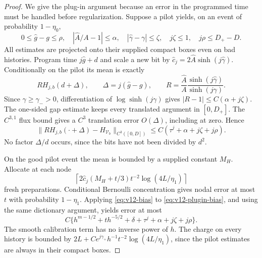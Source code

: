 \begin{proof}
We give the plug-in argument because an error in the programmed time
must be handled before regularization. Suppose a pilot yields, on
an event of probability $1-\eta_0$,
\[
 0\le\widehat g-g\le\rho,
 \quad |\widehat A/A-1|\le\alpha,
 \quad |\widehat\gamma-\gamma|\le\zeta,
 \quad j\zeta\le1,\quad j\rho\le D_+-D.
\]
All estimates are projected onto their supplied compact boxes even
on bad histories. Program time $j\widehat g+d$ and scale a new
bit by $\widehat c_j=2\widehat A\sinh(j\widehat\gamma)$.
Conditionally on the pilot its mean is exactly
\[
 R H_{j,b}(d+\Delta),\qquad
 \Delta=j(\widehat g-g),\qquad
 R=\frac{\widehat A}{A}
                         \frac{\sinh(j\widehat\gamma)}{\sinh(j\gamma)}.
\]
Since $\gamma\ge\gamma_->0$, differentiation of $\log\sinh(j\gamma)$
gives $|R-1|\le C(\alpha+j\zeta)$. The one-sided gap estimate
keeps every translated argument in $[0,D_+]$. The $C^{3,1}$
flux bound gives a $C^3$ translation error $O(\Delta)$, including
at zero. Hence
\begin{equation}\label{eq:v12-plugin-bias}
 \|R H_{j,b}(\cdot+\Delta)-H_{\mathcal V_b}\|_{C^3([0,D])}
                         \le C(\tau^j+\alpha+j\zeta+j\rho).
\end{equation}
No factor $\Delta/d$ occurs, since the bits have not been divided
by $d^2$.

On the good pilot event the mean is bounded by a supplied constant
$M_H$. Allocate at each node
\[
 \left\lceil2\widehat c_j(M_H+t/3)t^{-2}
                            \log(4L/\eta_1)\right\rceil
\]
fresh preparations. Conditional Bernoulli concentration gives nodal
error at most $t$ with probability $1-\eta_1$. Applying
\eqref{eq:v12-bias} to \eqref{eq:v12-plugin-bias}, and using the
same dictionary argument, yields error at most
\[
 C\{h^{m-1/2}+t h^{-5/2}+\delta+
                       \tau^j+\alpha+j\zeta+j\rho\}.
\]
The smooth calibration term has no inverse power of $h$. The charge
on every history is bounded by
$2L+C e^{j\gamma_+}h^{-1}t^{-2}\log(4L/\eta_1)$,
since the pilot estimates are always in their compact boxes.


\end{proof}
